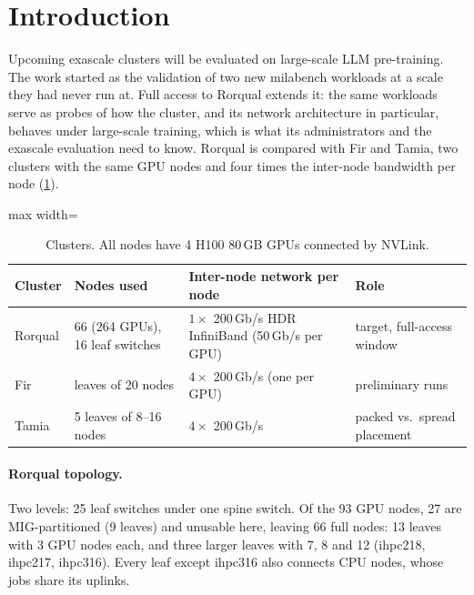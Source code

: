 \section{Introduction}
\label{sec:intro}

Upcoming exascale clusters will be evaluated on large-scale LLM pre-training. The work started as the
validation of two new milabench workloads at a scale they had never run at. Full access to Rorqual extends
it: the same workloads serve as probes of how the cluster, and its network architecture in particular,
behaves under large-scale training, which is what its administrators and the exascale evaluation need to
know. Rorqual is compared with Fir and Tamia, two clusters with the same GPU nodes and
four times the inter-node bandwidth per node (\cref{tab:clusters}).

\begin{table}[h]
  \caption{Clusters. All nodes have 4 H100 80\,GB GPUs connected by NVLink.}
  \label{tab:clusters}
  \centering\small
  \begin{adjustbox}{max width=\linewidth}
  \begin{tabular}{llll}
    \toprule
    Cluster & Nodes used & Inter-node network per node & Role \\
    \midrule
    Rorqual & 66 (264 GPUs), 16 leaf switches & $1\times$ 200\,Gb/s HDR InfiniBand (50\,Gb/s per GPU) & target, full-access window \\
    Fir     & leaves of 20 nodes & $4\times$ 200\,Gb/s (one per GPU) & preliminary runs \\
    Tamia   & 5 leaves of 8--16 nodes & $4\times$ 200\,Gb/s & packed vs.\ spread placement \\
    \bottomrule
  \end{tabular}
  \end{adjustbox}
\end{table}

\paragraph{Rorqual topology.} Two levels: 25 leaf switches under one spine switch. Of the 93 GPU nodes, 27
are MIG-partitioned (9 leaves) and unusable here, leaving 66 full nodes: 13 leaves with 3 GPU nodes each,
and three larger leaves with 7, 8 and 12 (ihpc218, ihpc217, ihpc316). Every leaf except ihpc316 also
connects CPU nodes, whose jobs share its uplinks.

